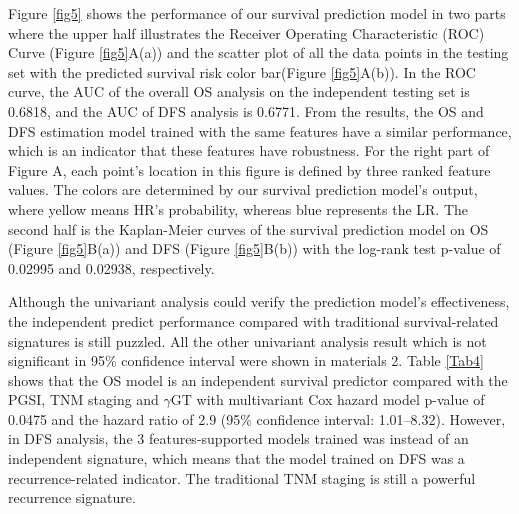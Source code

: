 \documentclass[num-refs]{wiley-article}
\begin{document}
Figure \ref{fig5} shows the performance of our survival prediction model in two parts where the upper half illustrates the Receiver Operating Characteristic (ROC) Curve (Figure \ref{fig5}A(a)) and the scatter plot of all the data points in the testing set with the predicted survival risk color bar(Figure \ref{fig5}A(b)). In the ROC curve, the AUC of the overall OS analysis on the independent testing set is 0.6818, and the AUC of DFS analysis is 0.6771. From the results, the OS and DFS estimation model trained with the same features have a similar performance, which is an indicator that these features have robustness. For the right part of Figure A, each point's location in this figure is defined by three ranked feature values. The colors are determined by our survival prediction model's output, where yellow means HR's probability, whereas blue represents the LR. The second half is the Kaplan-Meier curves of the survival prediction model on OS (Figure \ref{fig5}B(a)) and DFS (Figure \ref{fig5}B(b)) with the log-rank test p-value of 0.02995 and 0.02938, respectively.


Although the univariant analysis could verify the prediction model's effectiveness, the independent predict performance compared with traditional survival-related signatures is still puzzled. All the other univariant analysis result which is not significant in 95\% confidence interval were shown in  materials 2. Table \ref{Tab4} shows that the OS model is an independent survival predictor compared with the PGSI, TNM staging and $\gamma$GT with multivariant Cox hazard model p-value of 0.0475 and the hazard ratio of 2.9 (95\% confidence interval: 1.01–8.32). However, in DFS analysis, the 3 features-supported models trained was instead of an independent signature, which means that the model trained on DFS was a recurrence-related indicator. The traditional TNM staging is still a powerful recurrence signature.
\end{document}
